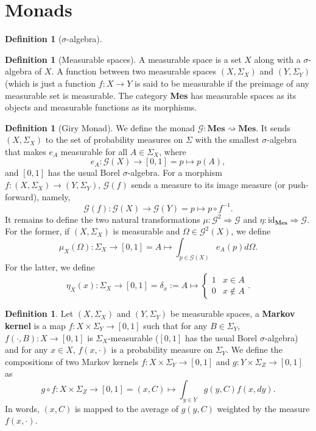 \documentclass{scrartcl}
\theoremstyle{definition}
\newtheorem{defn}[thm]{Definition}
\theoremstyle{remark}
\newcommand{\mG}{\mathcal{G}}
\begin{document}
\section{Monads}
\begin{defn}[$\sigma$-algebra]
\end{defn}
\begin{defn}[Measurable spaces]
    A measurable space is a set $X$ along with a $\sigma$-algebra of $X$. A function between two measurable spaces $(X,\Sigma_X)$ and $(Y,\Sigma_Y)$ (which is just a function $f:X\rightarrow Y$ is said to be measurable if the preimage of any measurable set is measurable. The category \textbf{Mes} has measurable spaces as its objects and measurable functions as its morphisms.
\end{defn}

\begin{defn}[Giry Monad]
    We define the monad $\mG: \textbf{Mes} \rightsquigarrow\textbf{Mes}$. It sends $(X, \Sigma_X)$ to the set of probability measures on $\Sigma$ with the smallest $\sigma$-algebra that makes $e_A$ measurable for all $A \in \Sigma_X$, where
    \[e_A: \mG(X) \rightarrow [0,1] = p \mapsto p(A),\]
    and $[0,1]$ has the usual Borel $\sigma$-algebra. For a morphism $f: (X,\Sigma_X) \rightarrow (Y, \Sigma_Y)$, $\mG(f)$ sends a measure to its image measure (or push-forward), namely,
    \[\mG(f): \mG(X) \rightarrow \mG(Y) = p \mapsto p\circ f^{-1}.\]
    It remains to define the two natural transformations $\mu: \mG^2 \Rightarrow \mG$ and $\eta: \text{id}_{\textbf{Mes}} \Rightarrow \mG$. For the former, if $(X,\Sigma_X)$ is measurable and $\Omega \in \mG^2(X)$, we define
    \[\mu_X(\Omega) : \Sigma_X \rightarrow [0,1] = A \mapsto \int_{p \in \mG(X)} e_A(p)d\Omega.\]
    For the latter, we define 
    \[\eta_X(x) : \Sigma_X \rightarrow [0,1] = \delta_x := A \mapsto \begin{cases}1&x \in A\\0&x \notin A\end{cases}.\]
\end{defn}
\begin{defn}
    Let $(X, \Sigma_X)$ and $(Y,\Sigma_Y)$ be measurable spaces, a \textbf{Markov kernel} is a map $f: X \times \Sigma_Y \rightarrow [0,1]$ such that for any $B \in \Sigma_Y$, $f(\cdot, B): X \rightarrow [0,1]$ is $\Sigma_X$-measurable ($[0,1]$ has the usual Borel $\sigma$-algebra) and for any $x \in X$, $f(x,\cdot)$ is a probability measure on $\Sigma_Y$. We define the compositions of two Markov kernels $f: X \times \Sigma_Y \rightarrow [0,1]$ and $g: Y \times \Sigma_Z \rightarrow [0,1]$ as 
    \[g \circ f : X \times \Sigma_Z \rightarrow [0,1] = (x, C) \mapsto \int_{y \in Y} g(y,C)f(x,dy).\]
    In words, $(x,C)$ is mapped to the average of $g(y,C)$ weighted by the measure $f(x,\cdot)$.
\end{defn}
\end{document}

